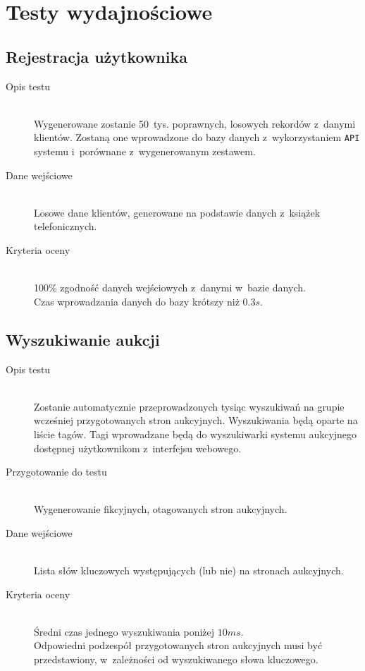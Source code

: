 \documentclass[10pt,a4paper]{article}
\newcommand{\f}[1]{\texttt{#1}}
\begin{document}
\section{Testy wydajnościowe}

\subsection{Rejestracja użytkownika}
\begin{description}
  \item[Opis testu] \hfill \\
    Wygenerowane zostanie 50~tys. poprawnych, losowych rekordów z~danymi
    klientów. Zostaną one wprowadzone do bazy danych z~wykorzystaniem \f{API}
    systemu i~porównane z~wygenerowanym zestawem.
  \item[Dane wejściowe] \hfill \\
    Losowe dane klientów, generowane na podstawie danych z~książek
    telefonicznych.
  \item[Kryteria oceny] \hfill \\
    100\% zgodność danych wejściowych z~danymi w~bazie danych.\\
    Czas wprowadzania danych do bazy krótszy niż $0.3 s$.
\end{description}

\subsection{Wyszukiwanie aukcji}
\begin{description}
  \item[Opis testu] \hfill \\
    Zostanie automatycznie przeprowadzonych tysiąc wyszukiwań na grupie
    wcześniej przygotowanych stron aukcyjnych. Wyszukiwania będą oparte na
    liście tagów. Tagi wprowadzane będą do wyszukiwarki systemu aukcyjnego
    dostępnej użytkownikom z~interfejsu webowego.
  \item[Przygotowanie do testu] \hfill \\
    Wygenerowanie fikcyjnych, otagowanych stron aukcyjnych.
  \item[Dane wejściowe] \hfill \\
    Lista słów kluczowych występujących (lub nie) na stronach aukcyjnych.
  \item[Kryteria oceny] \hfill \\
    Średni czas jednego wyszukiwania poniżej $10 ms$.\\
    Odpowiedni podzespół przygotowanych stron aukcyjnych musi być
    przedstawiony, w~zależności od wyszukiwanego słowa kluczowego.
\end{description}
\end{document}
